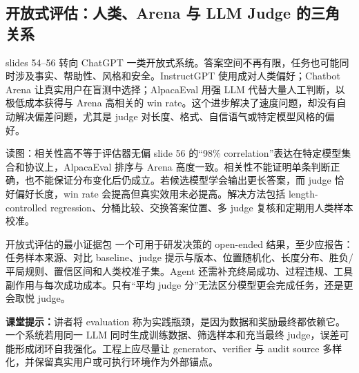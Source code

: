 \subsection{开放式评估：人类、Arena 与 LLM Judge 的三角关系}

slides 54--56 转向 ChatGPT 一类开放式系统。答案空间不再有限，任务也可能同时涉及事实、帮助性、风格和安全。InstructGPT 使用成对人类偏好；Chatbot Arena 让真实用户在盲测中选择；AlpacaEval 用强 LLM 代替大量人工判断，以极低成本获得与 Arena 高相关的 win rate。这个进步解决了速度问题，却没有自动解决偏差问题，尤其是 judge 对长度、格式、自信语气或特定模型风格的偏好。


\begin{knowledgebox}{读图：相关性高不等于评估器无偏}
slide 56 的“98\% correlation”表达在特定模型集合和协议上，AlpacaEval 排序与 Arena 高度一致。相关性不能证明单条判断正确，也不能保证分布变化后仍成立。若候选模型学会输出更长答案，而 judge 恰好偏好长度，win rate 会提高但真实效用未必提高。解决方法包括 length-controlled regression、分桶比较、交换答案位置、多 judge 复核和定期用人类样本校准。
\end{knowledgebox}

\begin{importantbox}{开放式评估的最小证据包}
一个可用于研发决策的 open-ended 结果，至少应报告：任务样本来源、对比 baseline、judge 提示与版本、位置随机化、长度分布、胜负/平局规则、置信区间和人类校准子集。Agent 还需补充终局成功、过程违规、工具副作用与每次成功成本。只有“平均 judge 分”无法区分模型更会完成任务，还是更会取悦 judge。
\end{importantbox}

\textbf{课堂提示：}讲者将 evaluation 称为实践瓶颈，是因为数据和奖励最终都依赖它。一个系统若用同一 LLM 同时生成训练数据、筛选样本和充当最终 judge，误差可能形成闭环自我强化。工程上应尽量让 generator、verifier 与 audit source 多样化，并保留真实用户或可执行环境作为外部锚点。

